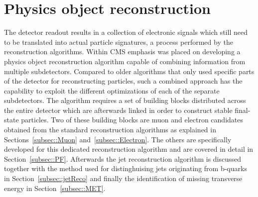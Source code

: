 \section{Physics object reconstruction} \label{sec::PhysicsObjects}

The detector readout results in a collection of electronic signals which still need to be translated into actual particle signatures, a process performed by the reconstruction algorithms.
Within CMS emphasis was placed on developing a physics object reconstruction algorithm capable of combining information from multiple subdetectors. 
Compared to older algorithms that only used specific parts of the detector for reconstructing particles, such a combined approach has the capability to exploit the different optimizations of each of the separate subdetectors.
The algorithm requires a set of building blocks distributed across the entire detector which are afterwards linked in order to construct stable final-state particles.
Two of these building blocks are muon and electron candidates obtained from the standard reconstruction algorithms as explained in Sections~\ref{subsec::Muon} and~\ref{subsec::Electron}. The others are specifically developed for this dedicated reconstruction algorithm and are covered in detail in Section~\ref{subsec::PF}.
Afterwards the jet reconstruction algorithm is discussed together with the method used for distinghuising jets originating from b-quarks in Section~\ref{subsec::jetReco} and finally the identification of missing transverse energy in Section~\ref{subsec::MET}.

